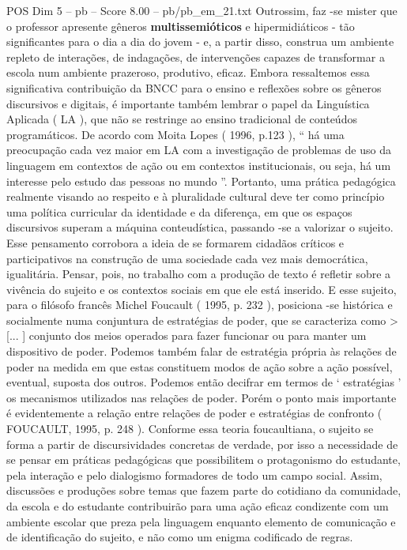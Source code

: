 \begin{textsample}{POS Dim 5 – pb – Score 8.00 – pb/pb\_em\_21.txt}
Outrossim, faz -se mister que o professor apresente gêneros \textbf{multissemióticos} e hipermidiáticos - tão significantes para o dia a dia do jovem - e, a partir disso, construa um ambiente repleto de interações, de indagações, de intervenções capazes de transformar a escola num ambiente prazeroso, produtivo, eficaz.
Embora ressaltemos essa significativa contribuição da BNCC para o ensino e reflexões sobre os gêneros discursivos e digitais, é importante também lembrar o papel da Linguística Aplicada ( LA ), que não se restringe ao ensino tradicional de conteúdos programáticos.
De acordo com Moita Lopes ( 1996, p.123 ), “ há uma preocupação cada vez maior em LA com a investigação de problemas de uso da linguagem em contextos de ação ou em contextos institucionais, ou seja, há um interesse pelo estudo das pessoas no mundo ”.
Portanto, uma prática pedagógica realmente visando ao respeito e à pluralidade cultural deve ter como princípio uma política curricular da identidade e da diferença, em que os espaços discursivos superam a máquina conteudística, passando -se a valorizar o sujeito.
Esse pensamento corrobora a ideia de se formarem cidadãos críticos e participativos na construção de uma sociedade cada vez mais democrática, igualitária.
Pensar, pois, no trabalho com a produção de texto é refletir sobre a vivência do sujeito e os contextos sociais em que ele está inserido.
E esse sujeito, para o filósofo francês Michel Foucault ( 1995, p. 232 ), posiciona -se histórica e socialmente numa conjuntura de estratégias de poder, que se caracteriza como > [... ] conjunto dos meios operados para fazer funcionar ou para manter um dispositivo de poder.
Podemos também falar de estratégia própria às relações de poder na medida em que estas constituem modos de ação sobre a ação possível, eventual, suposta dos outros.
Podemos então decifrar em termos de ‘ estratégias ’ os mecanismos utilizados nas relações de poder.
Porém o ponto mais importante é evidentemente a relação entre relações de poder e estratégias de confronto ( FOUCAULT, 1995, p. 248 ).
Conforme essa teoria foucaultiana, o sujeito se forma a partir de discursividades concretas de verdade, por isso a necessidade de se pensar em práticas pedagógicas que possibilitem o protagonismo do estudante, pela interação e pelo dialogismo formadores de todo um campo social.
Assim, discussões e produções sobre temas que fazem parte do cotidiano da comunidade, da escola e do estudante contribuirão para uma ação eficaz condizente com um ambiente escolar que preza pela linguagem enquanto elemento de comunicação e de identificação do sujeito, e não como um enigma codificado de regras.

\end{textsample}
